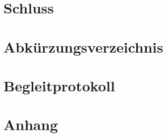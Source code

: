 \chapter{Schluss}
\label{chap:con}

\pagebreak

\chapter{Abkürzungsverzeichnis}
\pagebreak

\chapter{Begleitprotokoll}

\chapter{Anhang}\Blindtext[2]
